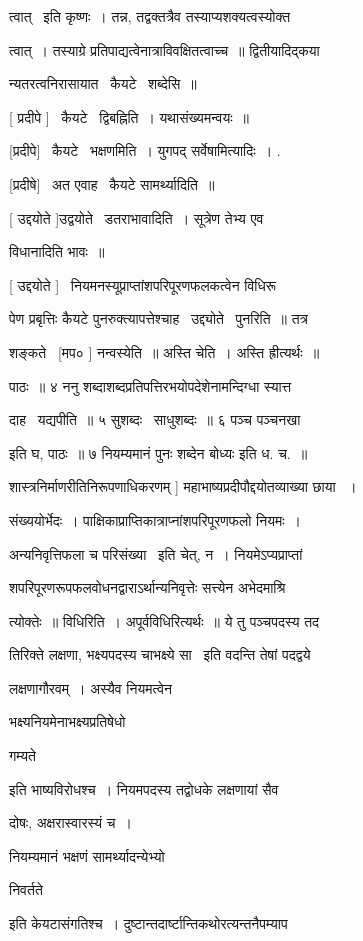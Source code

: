 \documentclass[11pt, openany]{book}
\begin{document}
त्वात् \textendash\ इति कृष्णः~। तन्न, तद्वक्तत्रैव तस्याप्यशक्यत्वस्योक्त \textendash\ 

त्वात्~। तस्याग्रे प्रतिपाद्यत्वेनात्राविवक्षितत्वाच्च~॥
द्वितीयादिद्कया \textendash\ 

न्यतरत्वनिरासायात \textendash\ कैयटे \textendash\ शब्देसि~॥ 

[ प्रदीपे ] \textendash\ कैयटे \textendash\ द्विबह्निति~। यथासंख्यमन्वयः~॥ 

[प्रदीपे] \textendash\ कैयटे \textendash\ भक्षणमिति~। युगपद् सर्वेषामित्यादिः~। . 

[प्रदीषे] \textendash\ अत एवाह \textendash\ कैयटे सामर्थ्यादिति~॥ 

[ उद्दयोते ]उद्वयोते \textendash\ डतराभावादिति~। सूत्रेण तेभ्य एव 

विधानादिति भावः~॥ 

[ उद्दयोते ] \textendash\ नियमनस्यूप्राप्तांशपरिपूरणफलकत्वेन विधिरू \textendash\ 

पेण प्रबृत्तिः कैयटे पुनरुक्त्यापत्तेश्चाह \textendash\ उद्द्योते \textendash\ पुनरिति~॥ तत्र 

शङ्कते \textendash\ [मप० ] नन्वस्येति~॥ अस्ति चेति~। अस्ति ह्रीत्यर्थः~॥ 

पाठः~॥ ४ ननु शब्दाशब्दप्रतिपत्तिरभयोपदेशेनामन्दिग्धा स्यात्त \textendash\ 

दाह \textendash\ यद्यपीति~॥ ५ सुशब्दः \textendash\ साधुशब्दः~॥ ६ {\qt पञ्च पञ्चनखा} 

इति घ, पाठः~॥ ७ {\qt नियम्यमानं पुनः शब्देन बोध्यः} इति ध. च.~॥ 

शास्त्रनिर्माणरीतिनिरूपणाधिकरणम् ] महाभाष्यप्रदीपौद्दयोतव्याख्या छाया
~। 

संख्ययोर्भेदः~। पाक्षिकाप्राप्तिकात्राप्नांशपरिपूरणफलो नियमः~। 

अन्यनिवृत्तिफला च परिसंख्या \textendash\ इति चेत्, न~। नियमेऽप्यप्राप्तां \textendash\ 

शपरिपूरणरूपफलवोधनद्वाराऽर्थान्यनिवृत्तेः सत्त्येन अभेदमाश्रि \textendash\ 

त्योक्तेः~॥ विधिरिति~। अपूर्वविधिरित्यर्थः~॥ ये तु पञ्चपदस्य तद \textendash\ 

तिरिक्ते लक्षणा, भक्ष्यपदस्य चाभक्ष्ये सा \textendash\ इति वदन्ति तेषां पदद्वये 

लक्षणागौरवम्~। अस्यैव नियमत्वेन {\qt भक्ष्यनियमेनाभक्ष्यप्रतिषेधो 

गम्यते} इति भाष्यविरोधश्च~। नियमपदस्य तद्वोधके लक्षणायां सैव 

दोषः, अक्षरास्वारस्यं च~। {\qt नियम्यमानं भक्षणं सामर्थ्यादन्येभ्यो 

निवर्तते} इति केयटासंगतिश्च~। दुष्टान्तदार्ष्टान्तिकथोरत्यन्तनैपम्याप \textendash\ 
\end{document}
